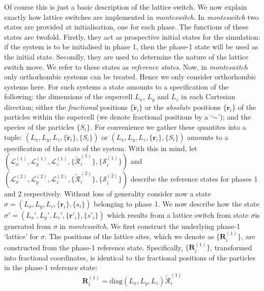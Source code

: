 \documentclass{report}
\begin{document}
Of course this is just a basic description of the lattice switch. We now explain exactly how lattice switches are implemented in \emph{monteswitch}. 
In \emph{monteswitch} two states are provided at initialisation, one for each phase. The functions of these states are twofold. Firstly, they act as 
prospective initial states for the simulation: if the system is to be initialised in phase 1, then the phase-1 state will be used as the initial state.
Secondly, they are used to determine the nature of the lattice switch move. We refer to these states as \emph{reference states}.
Now, in \emph{monteswitch} only orthorhombic systems can be treated. Hence we only consider orthorhombic systems here. For such systems a state 
amounts to a specification of the following: the dimensions of the supercell $L_x$, $L_y$ and $L_z$ in each Cartesian direction; either the \emph{fractional} 
positions $\lbrace\tilde{\mathbf{r}}_i\rbrace$ or the \emph{absolute} positions $\lbrace\mathbf{r}_i\rbrace$ of the particles within the supercell
(we denote fractional positions by a `$\sim$'); and the species of the particles $\lbrace S_i\rbrace$. For convenience we gather these quantites into
a tuple: $(L_x,L_y,L_z,\lbrace\tilde{\mathbf{r}}_i\rbrace,\lbrace S_i\rbrace)$ or $(L_x,L_y,L_z,\lbrace\mathbf{r}_i\rbrace,\lbrace S_i\rbrace)$ amounts to
a specification of the state of the system. With this in mind, let 
$(\mathcal{L}^{(1)}_x,\mathcal{L}^{(1)}_y,\mathcal{L}^{(1)}_z,\lbrace\tilde{\mathcal{R}}^{(1)}_i\rbrace,\lbrace\mathcal{S}^{(1)}_i\rbrace)$ and
$(\mathcal{L}^{(2)}_x,\mathcal{L}^{(2)}_y,\mathcal{L}^{(2)}_z,\lbrace\tilde{\mathcal{R}}^{(2)}_i\rbrace,\lbrace\mathcal{S}^{(2)}_i\rbrace)$ describe
the reference states for phases 1 and 2 respectively.
Without loss of generality consider now a state $\sigma=(L_x,L_y,L_z,\lbrace\mathbf{r}_i\rbrace,\lbrace s_i\rbrace)$ belonging to phase 1.
We now describe how the state $\sigma'=(L_x',L_y',L_z',\lbrace\mathbf{r}'_i\rbrace,\lbrace s'_i\rbrace)$ which results from a lattice switch from
state $\sigma$is generated from $\sigma$ in \emph{monteswitch}. We first construct the underlying phase-1 `lattice' for $\sigma$.
The positions of the lattice sites, which we denote as $\lbrace\mathbf{R}^{(1)}_i\rbrace$, are constructed from the phase-1 reference state. Specifically, 
$\lbrace\mathbf{R}^{(1)}_i\rbrace$, transformed into fractional coordinates, is identical to the fractional positions of the particles in the phase-1 
reference state:
\begin{equation}
\mathbf{R}^{(1)}_i = \text{diag}(L_x,L_y,L_z)\tilde{\mathcal{R}}^{(1)}_i
\end{equation}
\end{document}
